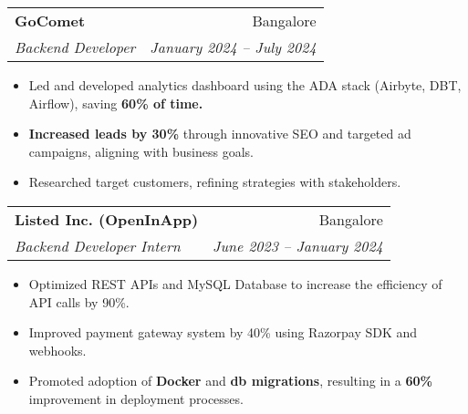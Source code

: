 \documentclass[letterpaper,11pt]{article}
\makeatletter
\newcommand{\resumeItem}[1]{
  \item\small{
    {#1 \vspace{-2pt}}
  }
}
\newcommand{\resumeSubheading}[4]{
  \vspace{-2pt}\item
    \begin{tabular*}{0.97\textwidth}[t]{l@{\extracolsep{\fill}}r}
      \textbf{#1} & #2 \\
      \textit{\small#3} & \textit{\small #4} \\
    \end{tabular*}\vspace{-7pt}
}
\newcommand{\resumeItemListStart}{\begin{itemize}}
\newcommand{\resumeItemListEnd}{\end{itemize}\vspace{-5pt}}
\makeatother
\begin{document}

    \resumeSubheading
    {GoComet}{Bangalore}
    {Backend Developer}{January 2024 -- July 2024}
        \resumeItemListStart
            \resumeItem{Led and developed analytics dashboard using the ADA stack (Airbyte, DBT, Airflow), saving \textbf{60\% of time.}}
            \resumeItem{\textbf{Increased leads by 30\%} through innovative SEO and targeted ad campaigns, aligning with business goals.}
            \resumeItem{Researched target customers, refining strategies with stakeholders.}
        \resumeItemListEnd

    \resumeSubheading
    {Listed Inc. (OpenInApp)}{Bangalore}
    {Backend Developer Intern}{June 2023 -- January 2024}
        \resumeItemListStart
            \resumeItem{Optimized REST APIs and MySQL Database to increase the efficiency of API calls by 90\%.}
            \resumeItem{Improved payment gateway system by 40\% using Razorpay SDK and webhooks.}
            \resumeItem{Promoted adoption of \textbf{Docker} and \textbf{db migrations}, resulting in a \textbf{60\%} improvement in deployment processes.}
        \resumeItemListEnd

        
    
       
\end{document}
